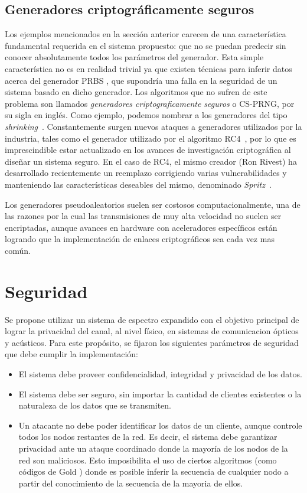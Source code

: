 \subsection{Generadores criptográficamente seguros}
\label{cap2:prng}
Los ejemplos mencionados en la sección anterior carecen de una característica fundamental requerida en el sistema propuesto: que no se puedan predecir sin conocer absolutamente todos los parámetros del generador. Esta simple característica no es en realidad trivial ya que existen técnicas para inferir datos acerca del generador PRBS \cite{argyros2012forgot}, que supondría una falla en la seguridad de un sistema basado en dicho generador. Los algoritmos que no sufren de este problema son llamados \textit{generadores criptograficamente seguros} o CS-PRNG, por su sigla en inglés. Como ejemplo, podemos nombrar a los generadores del tipo \textit{shrinking}~\cite{coppersmith1994shrinking}.
Constantemente surgen nuevos ataques a generadores utilizados por la industria, tales como el generador utilizado por el algoritmo RC4~\cite{vaudenay2007passive}, por lo que es imprescindible estar actualizado en los avances de investigación criptográfica al diseñar un sistema seguro. En el caso de RC4, el mismo creador (Ron Rivest) ha desarrollado recientemente un reemplazo corrigiendo varias vulnerabilidades y manteniendo las características deseables del mismo, denominado \textit{Spritz}~\cite{RS14}. 

Los generadores pseudoaleatorios suelen ser costosos computacionalmente, una de las razones por la cual las transmisiones de muy alta velocidad no suelen ser encriptadas, aunque avances en hardware con aceleradores específicos \cite{firasta2008intel} están logrando que la implementación de enlaces criptográficos sea cada vez mas común.

\section{Seguridad}
\label{Seguridad}

Se propone utilizar un sistema de espectro expandido con el objetivo principal de lograr la privacidad del canal, al nivel físico, en sistemas de comunicacion ópticos y acústicos.
Para este propósito, se fijaron los siguientes parámetros de seguridad que debe cumplir la implementación:

\begin{itemize}
 \item El sistema debe proveer confidencialidad, integridad y privacidad de los datos.
 \item El sistema debe ser seguro, sin importar la cantidad de clientes existentes o la naturaleza de los datos que se transmiten.
 \item Un atacante no debe poder identificar los datos de un cliente, aunque controle todos los nodos restantes de la red. Es decir, el sistema debe garantizar privacidad ante un ataque coordinado donde la mayoría de los nodos de la red son maliciosos. Esto imposibilita el uso de ciertos algoritmos (como códigos de Gold \cite{gold1967optimal}) donde es posible inferir la secuencia de cualquier nodo a partir del conocimiento de la secuencia de la mayoria de ellos.
\end{itemize}

